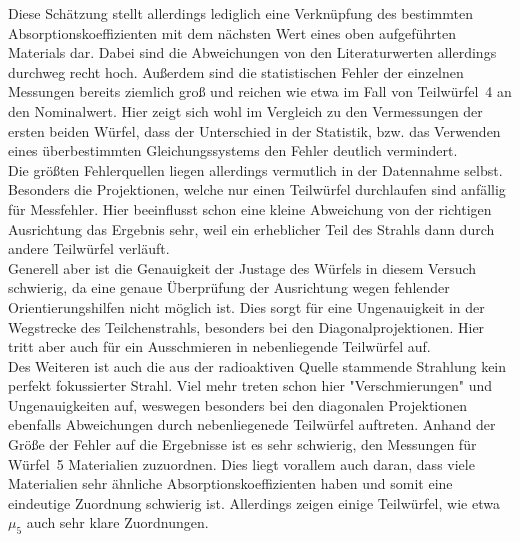 Diese Schätzung stellt allerdings lediglich eine Verknüpfung des bestimmten 
Absorptionskoeffizienten mit dem nächsten Wert eines oben aufgeführten 
Materials dar.
Dabei sind die Abweichungen von den Literaturwerten allerdings durchweg recht 
hoch. Außerdem sind die statistischen Fehler der einzelnen Messungen bereits 
ziemlich groß und reichen wie etwa im Fall von Teilwürfel~4 an den Nominalwert.
Hier zeigt sich wohl im Vergleich zu den Vermessungen der ersten beiden Würfel, 
dass der Unterschied in der Statistik, bzw. das Verwenden eines überbestimmten 
Gleichungssystems den Fehler deutlich vermindert. \\
Die größten Fehlerquellen liegen allerdings vermutlich in der Datennahme selbst.
Besonders die Projektionen, welche nur einen Teilwürfel durchlaufen sind 
anfällig für Messfehler. Hier beeinflusst schon eine kleine Abweichung von der 
richtigen Ausrichtung das Ergebnis sehr, weil ein erheblicher Teil des Strahls 
dann durch andere Teilwürfel verläuft. \\
Generell aber ist die Genauigkeit der Justage des Würfels in diesem Versuch 
schwierig, da eine genaue Überprüfung der Ausrichtung wegen fehlender 
Orientierungshilfen nicht möglich ist. Dies sorgt für eine Ungenauigkeit in der 
Wegstrecke des Teilchenstrahls, besonders bei den Diagonalprojektionen. Hier 
tritt aber auch für ein Ausschmieren in nebenliegende Teilwürfel auf. \\
Des Weiteren ist auch die aus der radioaktiven Quelle stammende Strahlung kein 
perfekt fokussierter Strahl. Viel mehr treten schon hier "Verschmierungen" und 
Ungenauigkeiten auf, weswegen besonders bei den diagonalen Projektionen 
ebenfalls Abweichungen durch nebenliegenede Teilwürfel auftreten.
Anhand der Größe der Fehler auf die Ergebnisse ist es sehr schwierig, den 
Messungen für Würfel~5 Materialien zuzuordnen. Dies liegt vorallem auch daran, 
dass viele Materialien sehr ähnliche Absorptionskoeffizienten haben und somit 
eine eindeutige Zuordnung schwierig ist. Allerdings zeigen einige Teilwürfel, 
wie etwa $\mu_5$ auch sehr klare Zuordnungen.